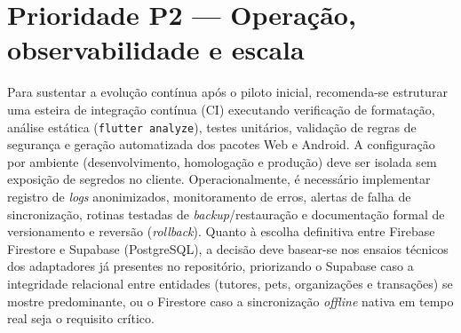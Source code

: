 \documentclass[12pt,a4paper]{article}
\begin{document}
\section{Prioridade P2 --- Operação, observabilidade e escala}
Para sustentar a evolução contínua após o piloto inicial, recomenda-se estruturar uma esteira de integração contínua (CI) executando verificação de formatação, análise estática (\texttt{flutter analyze}), testes unitários, validação de regras de segurança e geração automatizada dos pacotes Web e Android.
A configuração por ambiente (desenvolvimento, homologação e produção) deve ser isolada sem exposição de segredos no cliente. Operacionalmente, é necessário implementar registro de \textit{logs} anonimizados, monitoramento de erros, alertas de falha de sincronização, rotinas testadas de \textit{backup}/restauração e documentação formal de versionamento e reversão (\textit{rollback}). Quanto à escolha definitiva entre Firebase Firestore e Supabase (PostgreSQL), a decisão deve basear-se nos ensaios técnicos dos adaptadores já presentes no repositório, priorizando o Supabase caso a integridade relacional entre entidades (tutores, pets, organizações e transações) se mostre predominante, ou o Firestore caso a sincronização \textit{offline} nativa em tempo real seja o requisito crítico.
\end{document}
